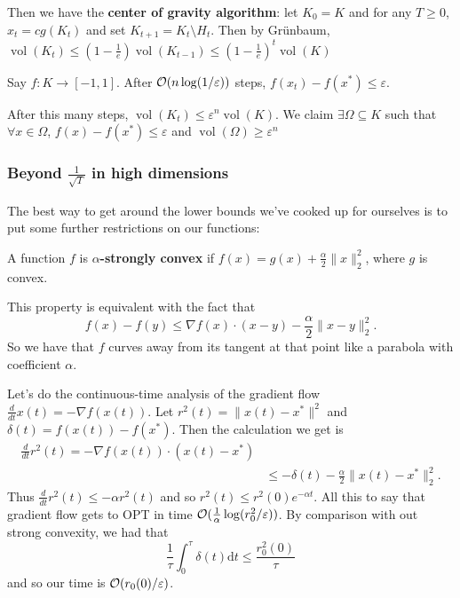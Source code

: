 \documentclass[12pt]{article}
\begin{document}
Then we have the \textbf{center of gravity algorithm}: let $K_0=K$ and for any $T\ge 0$, $x_t=cg(K_t)$ and set $K_{t+1}=K_t\setminus H_t$. Then by Gr\"unbaum, $\operatorname{vol}(K_t)\le(1-\frac{1}{e})\operatorname{vol}(K_{t-1})\le(1-\frac{1}{e})^t\operatorname{vol}(K)$
\begin{thm}
	Say $f:K\to [-1,1]$. After $\mathcal{O}(n\log(1/\varepsilon))$ steps, $f(x_t)-f(x^\ast)\le\varepsilon$.
\end{thm}
\begin{prf}
	After this many steps, $\operatorname{vol}(K_t)\le\varepsilon^n\operatorname{vol}(K)$. We claim $\exists \Omega\subseteq K$ such that $\forall x\in\Omega$, $f(x)-f(x^\ast)\le\varepsilon$ and $\operatorname{vol}(\Omega)\ge \varepsilon^n$
\end{prf}

\subsubsection{Beyond \texorpdfstring{$\frac{1}{\sqrt{T}}$}{1/sqrt(T)} in high dimensions}
The best way to get around the lower bounds we've cooked up for ourselves is to put some further restrictions on our functions:
\begin{defn}
	A function $f$ is $\alpha$\textbf{-strongly convex} if $f(x)=g(x)+\frac{\alpha}{2}\|x\|_2^2$, where $g$ is convex.
\end{defn}
\begin{rmk}
	This property is equivalent with the fact that 
	\[f(x)-f(y)\le \nabla f(x)\cdot (x-y)-\frac{\alpha}{2}\|x-y\|_2^2.\]
	So we have that $f$ curves away from its tangent at that point like a parabola with coefficient $\alpha$.
\end{rmk}

Let's do the continuous-time analysis of the gradient flow $\frac{d}{dt}x(t)=-\nabla f(x(t))$. Let $r^2(t)=\|x(t)-x^\ast\|^2$ and $\delta(t)=f(x(t))-f(x^\ast)$.
Then the calculation we get is 
\begin{align*}
	\frac{d}{dt} r^2(t)=-\nabla f(x(t))\cdot(x(t)-x^\ast)\\
	&\le -\delta(t)-\frac{\alpha}{2}\|x(t)-x^\ast\|^2_2.
\end{align*}
Thus $\frac{d}{dt}r^2(t)\le -\alpha r^2(t)$ and so $r^2(t)\le r^2(0)e^{-\alpha t}$. All this to say that gradient flow gets to OPT in time $\mathcal{O}(\frac{1}{\alpha}\log(r_0^2/\varepsilon))$. By comparison with out strong convexity, 
we had that 
\[\frac{1}{\tau}\int_0^\tau\delta(t)\mathrm{d}t\le \frac{r^2_0(0)}{\tau}\]
and so our time is $\mathcal{O}(r_0(0)/\varepsilon)$.
\end{document}
